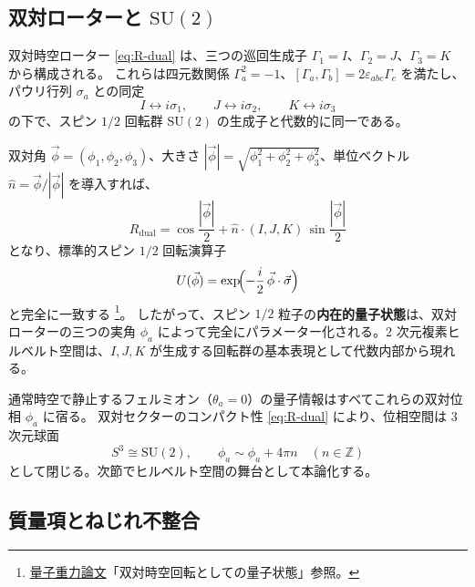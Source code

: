 \documentclass[dvipdfmx,a4paper,oneside]{jsbook}
\numberwithin{equation}{chapter}
\begin{document}
\subsection{双対ローターと \(\mathrm{SU}(2)\)}

双対時空ローター \eqref{eq:R-dual} は、三つの巡回生成子 \(\Gamma_1 = I\)、\(\Gamma_2 = J\)、\(\Gamma_3 = K\) から構成される。
これらは四元数関係 \(\Gamma_a^2 = -1\)、\([\Gamma_a, \Gamma_b] = 2\varepsilon_{abc}\Gamma_c\) を満たし、パウリ行列 \(\sigma_a\) との同定
\begin{equation}
  I \longleftrightarrow i\sigma_1,
  \qquad
  J \longleftrightarrow i\sigma_2,
  \qquad
  K \longleftrightarrow i\sigma_3
  \label{eq:pauli-correspondence}
\end{equation}
の下で、スピン \(1/2\) 回転群 \(\mathrm{SU}(2)\) の生成子と代数的に同一である。

双対角 \(\vec\phi = (\phi_1, \phi_2, \phi_3)\)、大きさ \(|\vec\phi| = \sqrt{\phi_1^2 + \phi_2^2 + \phi_3^2}\)、単位ベクトル \(\hat{n} = \vec\phi / |\vec\phi|\) を導入すれば、
\begin{equation}
  R_{\mathrm{dual}}
  = \cos\frac{|\vec\phi|}{2}
  + \hat{n}\cdot(I, J, K)\,\sin\frac{|\vec\phi|}{2}
  \label{eq:R-dual-vector}
\end{equation}
となり、標準的スピン \(1/2\) 回転演算子
\begin{equation}
  U(\vec\phi) = \exp\!\Bigl(-\frac{i}{2}\,\vec\phi\cdot\vec\sigma\Bigr)
  \label{eq:SU2-rotation}
\end{equation}
と完全に一致する \footnote{\hyperref[sec:sister-manuscripts]{量子重力論文}「双対時空回転としての量子状態」参照。}。
したがって、スピン \(1/2\) 粒子の\textbf{内在的量子状態}は、双対ローターの三つの実角 \(\phi_a\) によって完全にパラメーター化される。2 次元複素ヒルベルト空間は、\(I, J, K\) が生成する回転群の基本表現として代数内部から現れる。

通常時空で静止するフェルミオン（\(\theta_a = 0\)）の量子情報はすべてこれらの双対位相 \(\phi_a\) に宿る。
双対セクターのコンパクト性 \eqref{eq:R-dual} により、位相空間は 3 次元球面
\begin{equation}
  S^3 \cong \mathrm{SU}(2),
  \qquad \phi_a \sim \phi_a + 4\pi n \quad (n \in \mathbb{Z})
  \label{eq:S3-phase-space}
\end{equation}
として閉じる。次節でヒルベルト空間の舞台として本論化する。

\subsection{質量項とねじれ不整合}
\end{document}
